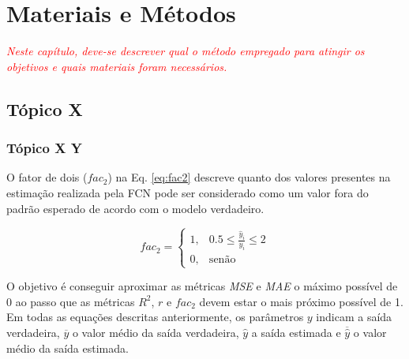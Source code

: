 \chapter{Materiais e Métodos}
\label{chapther:metodologia}

\textit{\textcolor{red}{Neste capítulo, deve-se descrever qual o método empregado para atingir os objetivos e quais materiais foram necessários.}}

\section{Tópico X}
\label{section:metodologia_xxx}

\lipsum[1-1]

\subsection{Tópico X Y}
\label{subsection:metodologia_xxx_yyy}

\lipsum[1-1]

O fator de dois ($fac_2$) na Eq. \ref{eq:fac2} descreve quanto dos valores presentes na estimação realizada pela FCN pode ser considerado como um valor fora do padrão esperado de acordo com o modelo verdadeiro. 

\begin{equation}
    fac_2 =
    \begin{cases}
        1,& 0.5 \leq \frac{\hat{y}_i}{y_i} \leq 2\\
        0,& \text{senão}
    \end{cases}
    \label{eq:fac2}
\end{equation}

O objetivo é conseguir aproximar as métricas \textit{MSE} e \textit{MAE} o máximo possível de 0 ao passo que as métricas $R^2$, $r$ e $fac_2$ devem estar o mais próximo possível de 1. Em todas as equações descritas anteriormente, os parâmetros $y$ indicam a saída verdadeira, $\overline{y}$ o valor médio da saída verdadeira, $\hat{y}$ a saída estimada e $\overline{\hat{y}}$ o valor médio da saída estimada.